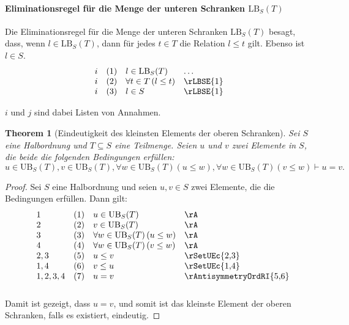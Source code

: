 \documentclass{book}
\theoremstyle{plain}
\newtheorem{theorem}{Theorem}
\theoremstyle{remark}
\theoremstyle{definition}
\begin{document}
\paragraph{Eliminationsregel für die Menge der unteren Schranken \(\text{LB}_S(T)\)}
Die Eliminationsregel für die Menge der unteren Schranken \(\text{LB}_S(T)\) besagt, dass, wenn \(l \in \text{LB}_S(T)\), dann für jedes \(t \in T\) die Relation \(l \leq t\) gilt. Ebenso ist \(l \in S\).
\[
\begin{array}{llll}
    i & (1) & l \in \text{LB}_S(T) & \dots \\
    i & (2) & \forall t \in T \, (l \leq t) & \rLBSE{1} \\
    i & (3) & l \in S & \rLBSE{1}
\end{array}
\]

\(i\) und \(j\) sind dabei Listen von Annahmen.

\label{uInUBwvInUBwFawInUBLpuLeqwRpwFawInUBLpvLeqwRpImpuEqualsv}
\begin{theorem}[Eindeutigkeit des kleinsten Elements der oberen Schranken]
    Sei \( S \) eine Halbordnung und \( T \subseteq S \) eine Teilmenge. Seien \( u \) und \( v \) zwei Elemente in \( S \), die beide die folgenden Bedingungen erfüllen:
    \[
    u \in \text{UB}_S(T), v \in \text{UB}_S(T), \forall w \in \text{UB}_S(T) (u \leq w), \forall w \in \text{UB}_S(T) (v \leq w) \vdash u = v.
    \]
\end{theorem}

\begin{proof}
    Sei \( S \) eine Halbordnung und seien \( u, v \in S \) zwei Elemente, die die Bedingungen erfüllen. Dann gilt:
    \[
    \begin{array}{lll p{4cm}}
        1 & (1) & u \in \text{UB}_S(T) & \rA \\
        2 & (2) & v \in \text{UB}_S(T) & \rA \\
        3 & (3) & \forall w \in \text{UB}_S(T) \, (u \leq w) & \rA \\
        4 & (4) & \forall w \in \text{UB}_S(T) \, (v \leq w) & \rA \\
        2,3 & (5) & u \leq v & \rSetUEc{2,3}  \\
        1,4 & (6) & v \leq u & \rSetUEc{1,4} \\
        1,2,3,4 & (7) & u = v & \rAntisymmetryOrdRI{5,6} \\
    \end{array}
    \]
    Damit ist gezeigt, dass \( u = v \), und somit ist das kleinste Element der oberen Schranken, falls es existiert, eindeutig.
\end{proof}
\end{document}

